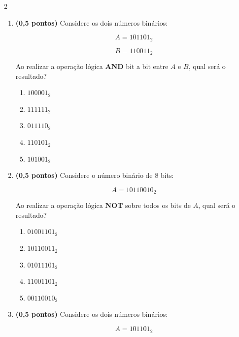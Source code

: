 \documentclass[a4paper,12pt]{article}
\begin{document}
\begin{multicols}{2}
\begin{enumerate}[leftmargin=*]

\item \textbf{(0,5 pontos)} Considere os dois números binários:

\[
A = 101101_2
\]

\[
B = 110011_2
\]

Ao realizar a operação lógica \textbf{AND} bit a bit entre $A$ e $B$,
qual será o resultado?

\begin{enumerate}[label=(\Alph*)]
    \item $100001_2$
    \item $111111_2$
    \item $011110_2$
    \item $110101_2$
    \item $101001_2$
\end{enumerate}

\vspace{0.2cm}


\item \textbf{(0,5 pontos)} Considere o número binário de 8 bits:

\[
A = 10110010_2
\]

Ao realizar a operação lógica \textbf{NOT} sobre todos os bits de $A$,
qual será o resultado?

\begin{enumerate}[label=(\Alph*)]
    \item $01001101_2$
    \item $10110011_2$
    \item $01011101_2$
    \item $11001101_2$
    \item $00110010_2$
\end{enumerate}

\vspace{0.2cm}


\item \textbf{(0,5 pontos)} Considere os dois números binários:

\[
A = 101101_2
\]


\end{enumerate}
\end{multicols}
\end{document}
